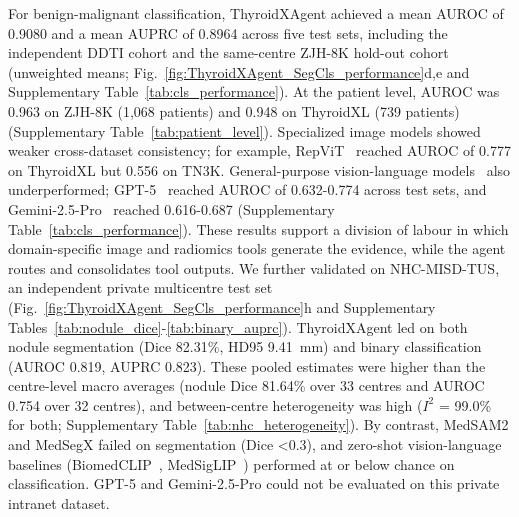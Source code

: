 \documentclass[fleqn,10pt]{wlscirep}
\begin{document}
For benign-malignant classification, ThyroidXAgent achieved a mean AUROC of 0.9080 and a mean AUPRC of 0.8964 across five test sets, including the independent DDTI cohort and the same-centre ZJH-8K hold-out cohort (unweighted means; Fig.~\ref{fig:ThyroidXAgent_SegCls_performance}d,e and Supplementary Table~\ref{tab:cls_performance}). At the patient level, AUROC was 0.963 on ZJH-8K (1,068 patients) and 0.948 on ThyroidXL (739 patients) (Supplementary Table~\ref{tab:patient_level}). Specialized image models showed weaker cross-dataset consistency; for example, RepViT~\cite{wang2023repvit} reached AUROC of 0.777 on ThyroidXL but 0.556 on TN3K. General-purpose vision-language models~\cite{dong2022survey} also underperformed; GPT-5~\cite{openai2025gpt5systemcard} reached AUROC of 0.632-0.774 across test sets, and Gemini-2.5-Pro~\cite{comanici_gemini_2025} reached 0.616-0.687 (Supplementary Table~\ref{tab:cls_performance}). These results support a division of labour in which domain-specific image and radiomics tools generate the evidence, while the agent routes and consolidates tool outputs. We further validated on NHC-MISD-TUS, an independent private multicentre test set (Fig.~\ref{fig:ThyroidXAgent_SegCls_performance}h and Supplementary Tables~\ref{tab:nodule_dice}-\ref{tab:binary_auprc}). ThyroidXAgent led on both nodule segmentation (Dice 82.31\%, HD95 9.41~mm) and binary classification (AUROC 0.819, AUPRC 0.823). These pooled estimates were higher than the centre-level macro averages (nodule Dice 81.64\% over 33 centres and AUROC 0.754 over 32 centres), and between-centre heterogeneity was high ($I^2$ = 99.0\% for both; Supplementary Table~\ref{tab:nhc_heterogeneity}). By contrast, MedSAM2 and MedSegX failed on segmentation (Dice <0.3), and zero-shot vision-language baselines (BiomedCLIP~\cite{zhang2024biomedclip}, MedSigLIP~\cite{sellergren2025medgemma}) performed at or below chance on classification. GPT-5 and Gemini-2.5-Pro could not be evaluated on this private intranet dataset.
\end{document}

